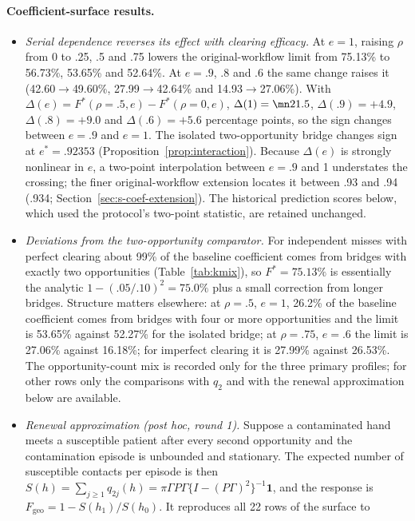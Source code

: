 \paragraph{Coefficient-surface results.}
\begin{itemize}
\item \emph{Serial dependence reverses its effect with clearing efficacy.} At
$e=1$, raising $\rho$ from 0 to .25, .5 and .75 lowers the original-workflow
limit from 75.13\% to 56.73\%, 53.65\% and 52.64\%. At $e=.9$, .8 and .6 the
same change raises it (42.60$\to$49.60\%, 27.99$\to$42.64\% and
14.93$\to$27.06\%). With $\Delta(e)=F^*(\rho{=}.5,e)-F^*(\rho{=}0,e)$, $\Delta(1)=\mn21.5$,
$\Delta(.9)=+4.9$, $\Delta(.8)=+9.0$ and $\Delta(.6)=+5.6$ percentage points, so the sign
changes between $e=.9$ and $e=1$. The isolated two-opportunity bridge changes sign at
$e^*=.92353$ (Proposition~\ref{prop:interaction}). Because $\Delta(e)$ is
strongly nonlinear in $e$, a two-point interpolation between $e=.9$ and 1
understates the crossing; the finer original-workflow extension locates it
between .93 and .94 (.934; Section~\ref{sec:s-coef-extension}). The historical
prediction scores below, which used the protocol's two-point statistic, are
retained unchanged.
\item \emph{Deviations from the two-opportunity comparator.}
For independent misses with perfect clearing about 99\% of the baseline
coefficient comes from bridges with exactly two opportunities
(Table~\ref{tab:kmix}), so $F^*=75.13\%$ is essentially the analytic
$1-(.05/.10)^2=75.0\%$ plus a small correction from longer bridges. Structure
matters elsewhere: at $\rho=.5$, $e=1$, 26.2\% of the baseline coefficient comes
from bridges with four or more opportunities and the limit is 53.65\% against
52.27\% for the isolated bridge; at $\rho=.75$, $e=.6$ the limit is 27.06\%
against 16.18\%; for imperfect clearing it is 27.99\% against 26.53\%. The
opportunity-count mix is recorded only for the three primary profiles; for
other rows only the comparisons with $q_2$ and with the renewal approximation
below are available.
\item \emph{Renewal approximation (post hoc, round 1).} Suppose a contaminated
hand meets a susceptible patient after every second opportunity and the
contamination episode is unbounded and stationary. The expected number of
susceptible contacts per episode is then $S(h)=\sum_{j\ge1}q_{2j}(h)=\pi\Gamma
P\Gamma\{I-(P\Gamma)^2\}^{-1}\boldsymbol 1$, and the response is
$F_{\mathrm{geo}}=1-S(h_1)/S(h_0)$. It reproduces all 22 rows of the surface to

\end{itemize}

